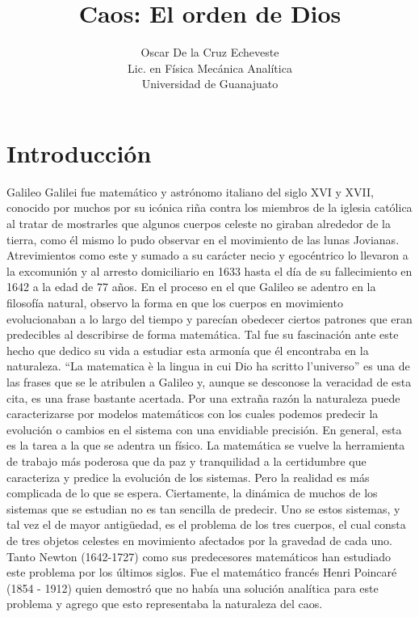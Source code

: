 \documentclass[11pt,twocolumn,spanish]{article}
\title{Caos: El orden de Dios}
\author{Oscar De la Cruz Echeveste\\
\small Lic. en Física  
  \small Mecánica Analítica\\
  \small Universidad de Guanajuato\\
  \small 
}
\theoremstyle{definition}
\theoremstyle{remark}
\begin{document}
\maketitle


\section{Introducción}
Galileo Galilei fue matemático y astrónomo italiano del siglo XVI y XVII, conocido por muchos por su icónica riña contra los miembros de la iglesia católica al tratar de mostrarles que algunos cuerpos celeste no giraban alrededor de la tierra, como él mismo lo pudo observar en el movimiento de las lunas Jovianas. Atrevimientos como este y sumado a su carácter necio y egocéntrico lo llevaron a la excomunión y al arresto domiciliario en 1633 hasta el día de su fallecimiento en 1642 a la edad de 77 años. En el proceso en el que Galileo se adentro en la filosofía natural, observo la forma en que los cuerpos en movimiento evolucionaban a lo largo del tiempo y parecían obedecer ciertos patrones que eran predecibles al describirse de forma matemática. Tal fue su fascinación ante este hecho que dedico su vida a estudiar esta armonía que él encontraba en la naturaleza. “La matematica è la lingua in cui Dio ha scritto l'universo” es una de las frases que se le atribulen a Galileo y, aunque se desconose la veracidad de esta cita, es una frase bastante acertada. Por una extraña razón la naturaleza puede caracterizarse por modelos matemáticos con los cuales podemos predecir la evolución o cambios en el sistema con una envidiable precisión. En general, esta es la tarea a la que se adentra un físico. La matemática se vuelve la herramienta de trabajo más poderosa que da paz y tranquilidad a la certidumbre que caracteriza y predice la evolución de los sistemas. Pero la realidad es más complicada de lo que se espera. Ciertamente, la dinámica de muchos de los sistemas que se estudian no es tan sencilla de predecir. Uno se estos sistemas, y tal vez el de mayor antigüedad, es el problema de los tres cuerpos, el cual consta de tres objetos celestes en movimiento afectados por la gravedad de cada uno. Tanto Newton (1642-1727) como sus predecesores matemáticos han estudiado este problema por los últimos siglos. Fue el matemático francés Henri Poincaré (1854 - 1912) quien demostró que no había una solución analítica para este problema y agrego que esto representaba la naturaleza del caos. 
\end{document}
